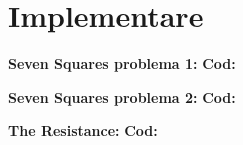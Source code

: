 \section{Implementare}

\textbf{Seven Squares problema 1:}\newline\newline
\textbf{Cod:}\newline\newline

\noindent{}
\newline\newline
\newline\newline
 \textbf{Seven Squares problema 2:}\newline\newline
\textbf{Cod:}\newline\newline

\noindent{}\pagebreak



\textbf{The Resistance:}\newline\newline
\textbf{Cod:}\newline
\inputminted[linenos]{python}{code/spy.in}








